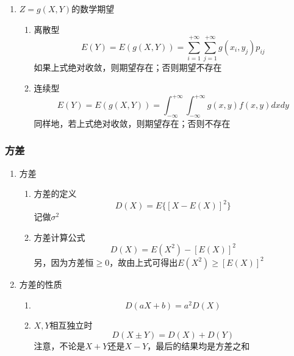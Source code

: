 \begin{enumerate}
	\item $Z=g(X,Y)$的数学期望
	\begin{enumerate}
		\item 离散型
			\begin{equation}
				E(Y) = E(g(X,Y)) = \sum_{i=1}^{+\infty}\sum_{j=1}^{+\infty} g(x_i, y_j)p_{ij}
			\end{equation}
			如果上式绝对收敛，则期望存在；否则期望不存在
		\item 连续型
			\begin{equation}
				E(Y) = E(g(X,Y)) = \int_{-\infty}^{+\infty}\int_{-\infty}^{+\infty}g(x,y)f(x,y)dxdy
			\end{equation}
			同样地，若上式绝对收敛，则期望存在；否则不存在
	\end{enumerate}
\end{enumerate}

\subsubsection{方差}
\begin{enumerate}
	\item 方差
	\begin{enumerate}
		\item 方差的定义
		\begin{equation}
			D(X) = E\{\left[X-E(X)\right]^2\}
		\end{equation}
		记做$\sigma^2$
		\item 方差计算公式
		\begin{equation}
			D(X) = E(X^2) - \left[ E(X) \right]^2
		\end{equation}
		另，因为方差恒$\geq 0$，故由上式可得出$E(X^2) \geq \left[ E(X) \right]^2$
	\end{enumerate}

	\item 方差的性质
	\begin{enumerate}
		\item 
		\begin{equation}
			D(aX+b) = a^2D(X)
		\end{equation}
		\item $X,Y$相互独立时
		\begin{equation}
			D(X\pm Y) = D(X) + D(Y)
		\end{equation}
		注意，不论是$X+Y$还是$X-Y$，最后的结果均是方差之和
	\end{enumerate}
\end{enumerate}

